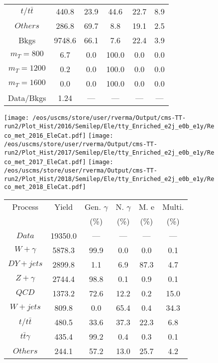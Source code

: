 \begin{figure}
\begin{minipage}[c]{0.32\textwidth}
{\begin{tabular}{cccccc}
$ t/t\bar{t} $ &  440.8 &  23.9 &  44.6 &  22.7 &  8.9\\
$ Others $ &  286.8 &  69.7 &  8.8 &  19.1 &  2.5\\
Bkgs &  9748.6 &  66.1 &  7.6 &  22.4 &  3.9\\
$ m_{T} = 800 $ &  6.7 &  0.0 &  100.0 &  0.0 &  0.0\\
$ m_{T} = 1200 $ &  0.2 &  0.0 &  100.0 &  0.0 &  0.0\\
$ m_{T} = 1600 $ &  0.0 &  0.0 &  100.0 &  0.0 &  0.0\\
Data/Bkgs &  1.24 &  --- &  --- &  --- &  ---\\
\hline
\end{tabular}
}
\end{minipage}
\end{figure}

\begin{figure}
\centering
\texttt{[image: /eos/uscms/store/user/rverma/Output/cms-TT-run2/Plot\_Hist/2016/Semilep/Ele/tty\_Enriched\_e2j\_e0b\_e1y/Reco\_met\_2016\_EleCat.pdf]}
\texttt{[image: /eos/uscms/store/user/rverma/Output/cms-TT-run2/Plot\_Hist/2017/Semilep/Ele/tty\_Enriched\_e2j\_e0b\_e1y/Reco\_met\_2017\_EleCat.pdf]}
\texttt{[image: /eos/uscms/store/user/rverma/Output/cms-TT-run2/Plot\_Hist/2018/Semilep/Ele/tty\_Enriched\_e2j\_e0b\_e1y/Reco\_met\_2018\_EleCat.pdf]}
\begin{minipage}[c]{0.32\textwidth}
\centering
\tiny{
\begin{tabular}{cccccc}
\hline
Process & Yield & Gen. $\gamma$ & N. $\gamma$ & M. e & Multi. \\
 &  & (\%) & (\%) & (\%) & (\%)  \\
\hline
                                                                      $ Data $ &  19350.0 &  --- &  --- &  --- &  ---\\
$ W+\gamma $ &  5878.3 &  99.9 &  0.0 &  0.0 &  0.1\\
$ DY+jets $ &  2899.8 &  1.1 &  6.9 &  87.3 &  4.7\\
$ Z+\gamma $ &  2744.4 &  98.8 &  0.1 &  0.9 &  0.1\\
$ QCD $ &  1373.2 &  72.6 &  12.2 &  0.2 &  15.0\\
$ W+jets $ &  809.8 &  0.0 &  65.4 &  0.4 &  34.3\\
$ t/t\bar{t} $ &  480.5 &  33.6 &  37.3 &  22.3 &  6.8\\
$ t\bar{t}\gamma $ &  435.4 &  99.2 &  0.4 &  0.3 &  0.1\\
$ Others $ &  244.1 &  57.2 &  13.0 &  25.7 &  4.2\\

\end{tabular}}
\end{minipage}
\end{figure}
